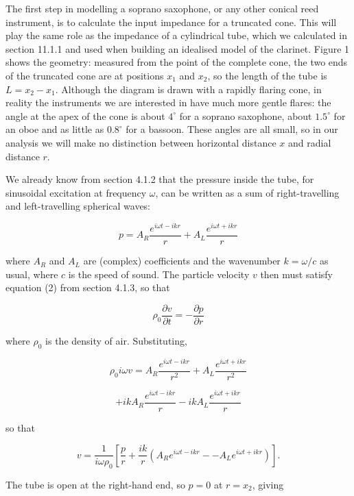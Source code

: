   The first step in modelling a soprano saxophone, or any other conical reed 
  instrument, is to calculate the input impedance for a truncated cone. This 
  will play the same role as the impedance of a cylindrical tube, which we 
  calculated in section 11.1.1 and used when building an idealised model of the 
  clarinet. Figure 1 shows the geometry: measured from the point of the 
  complete cone, the two ends of the truncated cone are at positions $x_1$ and 
  $x_2$, so the length of the tube is $L=x_2-x_1$. Although the diagram is 
  drawn with a rapidly flaring cone, in reality the instruments we are 
  interested in have much more gentle flares: the angle at the apex of the cone 
  is about $4^\circ$ for a soprano saxophone, about $1.5^\circ$ for an oboe and 
  as little as $0.8^\circ$ for a bassoon. These angles are all small, so in our 
  analysis we will make no distinction between horizontal distance $x$ and 
  radial distance $r$. 


  We already know from section 4.1.2 that the pressure inside the tube, for 
  sinusoidal excitation at frequency $\omega$, can be written as a sum of 
  right-travelling and left-travelling spherical waves: 

  $$p=A_R \dfrac{e^{i \omega t -ikr}}{r} + A_L \dfrac{e^{i \omega t +ikr}}{r} 
  \tag{1}$$ 

  where $A_R$ and $A_L$ are (complex) coefficients and the wavenumber 
  $k=\omega/c$ as usual, where $c$ is the speed of sound. The particle velocity 
  $v$ then must satisfy equation (2) from section 4.1.3, so that 

  $$\rho_0\dfrac{\partial v}{\partial t}=-\dfrac{\partial p}{\partial r} 
  \tag{2}$$ 

  where $\rho_0$ is the density of air. Substituting, 

  $$\rho_0 i \omega v = A_R \dfrac{e^{i \omega t -ikr}}{r^2} + A_L \dfrac{e^{i 
  \omega t +ikr}}{r^2}$$ 

  $$+ ik A_R\dfrac{e^{i \omega t -ikr}}{r}- ik A_L\dfrac{e^{i \omega t 
  +ikr}}{r} \tag{3}$$ 

  so that 

  $$v=\dfrac{1}{i \omega \rho_0}\left[ \dfrac{p}{r}+\dfrac{ik}{r}\left(A_R e^{i 
  \omega t -ikr} -- A_L e^{i \omega t +ikr} \right) \right] . \tag{4}$$ 

  The tube is open at the right-hand end, so $p=0$ at $r=x_2$, giving 

